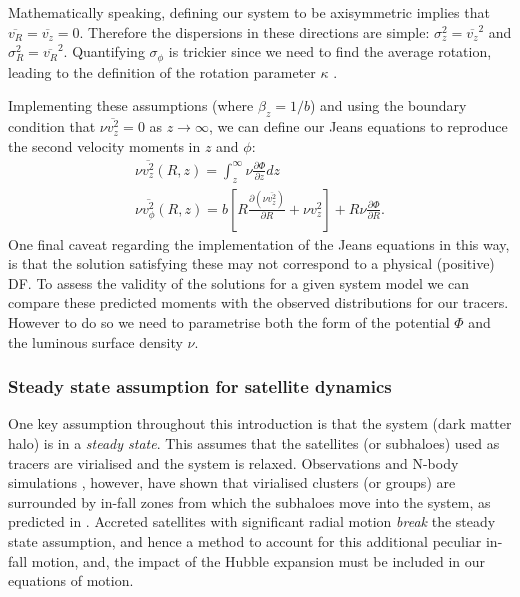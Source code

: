 Mathematically speaking, defining our system to be axisymmetric implies that $\overline{v_{R}} = \overline{v_{z}} = 0$. Therefore the dispersions in these directions are simple: $\sigma_{z}^2 = \overline{v_z}^2$ and $\sigma_{R}^2 = \overline{v_R}^2$. Quantifying $\sigma_{\phi}$ is trickier since we need to find the average rotation, leading to the definition of the rotation parameter $\kappa$ . 

Implementing these assumptions (where $\beta_z = 1/b$) and using the boundary condition that $\nu \overline{v_z^2} = 0$ as $z \to \infty$, we can define our Jeans equations to reproduce the second velocity moments in $z$ and $\phi$:
\begin{eqnarray} \label{jeans1}
\nu \overline{v_z^2}(R,z) = \int^{\infty}_{z} \nu \frac{\partial \Phi}{\partial z} dz \\
\nu \overline{v_{\phi}^2}(R,z) = b \left[ R \frac{\partial (\nu \overline{v_z^2})}{\partial R} + \nu v_{z}^2\right] + R\nu \frac{\partial \Phi}{\partial R} . \label{jeans2}
\end{eqnarray}
One final caveat regarding the implementation of the Jeans equations in this way, is that the solution satisfying these may not correspond to a physical (positive) DF. To assess the validity of the solutions for a given system model we can compare these predicted moments with the observed distributions for our tracers. However to do so we need to parametrise both the form of the potential $\Phi$ and the luminous surface density $\nu$.

\subsubsection{Steady state assumption for satellite dynamics}
One key assumption throughout this introduction is that the system (dark matter halo) is in a \textit{steady state}. This assumes that the satellites (or subhaloes) used as tracers are virialised and the system is relaxed. Observations \citep[e.g.][]{mamon2005} and N-body simulations \citep[e.g.][]{mahajan2011}, however, have shown that virialised clusters (or groups) are surrounded by in-fall zones from which the subhaloes move into the system, as predicted in \citet{gunn1972}. Accreted satellites with significant radial motion \textit{break} the steady state assumption, and hence a method to account for this additional peculiar in-fall motion, and, the impact of the Hubble expansion must be included in our equations of motion.

